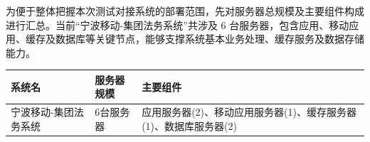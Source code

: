 


为便于整体把握本次测试对接系统的部署范围，先对服务器总规模及主要组件构成进行汇总。当前“宁波移动-集团法务系统”共涉及 6 台服务器，包含应用、移动应用、缓存及数据库等关键节点，能够支撑系统基本业务处理、缓存服务及数据存储能力。\par

\vspace{0.25em}

\begin{center}
\setlength{\tabcolsep}{4pt}
\renewcommand{\arraystretch}{1.6}
\begin{tabular}{>{\Centering\arraybackslash}p{}>{\Centering\arraybackslash}p{}>{\Centering\arraybackslash}p{}}
\hline
\cellcolor{HeaderBlue}\color{white}\bfseries 系统名 & \cellcolor{HeaderBlue}\color{white}\bfseries 服务器规模 & \cellcolor{HeaderBlue}\color{white}\bfseries 主要组件 \\
\hline
宁波移动-\hspace{0pt}集团法务系统 & 6台服务器 & 应用服务器(2)、移动应用服务器(1)、缓存服务器(1)、数据库服务器(2) \\
\hline
\end{tabular}
\end{center}

\vspace{0.25em}


